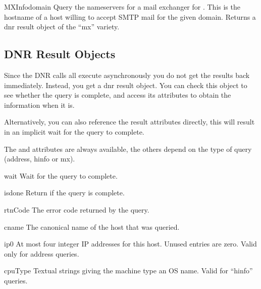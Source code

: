 \begin{funcdesc}{MXInfo}{domain}
Query the nameservers for a mail exchanger for .  This is
the hostname of a host willing to accept SMTP mail for the
given domain.  Returns a dnr result object of the ``mx'' variety.
\end{funcdesc}


\subsection{DNR Result Objects \label{dnr-result-object}}

Since the DNR calls all execute asynchronously you do not get the
results back immediately.  Instead, you get a dnr result object.  You
can check this object to see whether the query is complete, and access
its attributes to obtain the information when it is.

Alternatively, you can also reference the result attributes directly,
this will result in an implicit wait for the query to complete.

The  and  attributes are always
available, the others depend on the type of query (address, hinfo or
mx).


\begin{methoddesc}{wait}{}
Wait for the query to complete.
\end{methoddesc}

\begin{methoddesc}{isdone}{}
Return  if the query is complete.
\end{methoddesc}


\begin{memberdesc}{rtnCode}
The error code returned by the query.
\end{memberdesc}

\begin{memberdesc}{cname}
The canonical name of the host that was queried.
\end{memberdesc}

\begin{memberdesc}{ip0}
At most four integer IP addresses for this host.  Unused entries are
zero.  Valid only for address queries.
\end{memberdesc}

\begin{memberdesc}{cpuType}
Textual strings giving the machine type an OS name.  Valid for ``hinfo''
queries.
\end{memberdesc}

